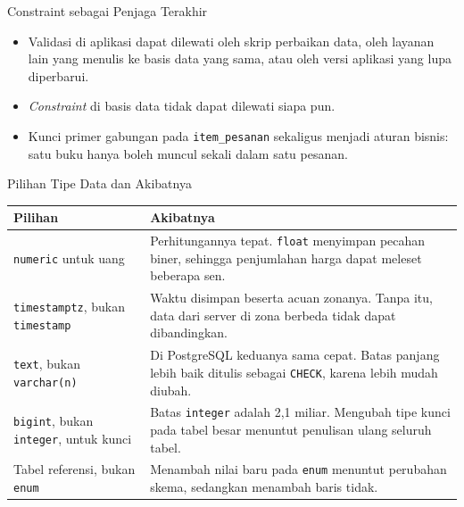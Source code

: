 \documentclass[aspectratio=169, table, 12pt]{beamer}
\begin{document}
\begin{frame}{{\Large Constraint sebagai Penjaga Terakhir}}
  \vspace{10pt}
  \begin{itemize}
    \item Validasi di aplikasi dapat dilewati oleh skrip perbaikan data, oleh
          layanan lain yang menulis ke basis data yang sama, atau oleh versi
          aplikasi yang lupa diperbarui.
    \item \textit{Constraint} di basis data tidak dapat dilewati siapa pun.
    \item Kunci primer gabungan pada \texttt{item\_pesanan} sekaligus menjadi
          aturan bisnis: satu buku hanya boleh muncul sekali dalam satu
          pesanan.
  \end{itemize}
\end{frame}

\begin{frame}{{\Large Pilihan Tipe Data dan Akibatnya}}
  \vspace{5pt}
  \centering
  {\scriptsize
  \begin{tabularx}{\textwidth}{lX}
    \hline
    \textbf{Pilihan} & \textbf{Akibatnya} \\
    \hline
    \texttt{numeric} untuk uang & Perhitungannya tepat. \texttt{float} menyimpan pecahan biner, sehingga penjumlahan harga dapat meleset beberapa sen. \\
    \hline
    \texttt{timestamptz}, bukan \texttt{timestamp} & Waktu disimpan beserta acuan zonanya. Tanpa itu, data dari server di zona berbeda tidak dapat dibandingkan. \\
    \hline
    \texttt{text}, bukan \texttt{varchar(n)} & Di PostgreSQL keduanya sama cepat. Batas panjang lebih baik ditulis sebagai \texttt{CHECK}, karena lebih mudah diubah. \\
    \hline
    \texttt{bigint}, bukan \texttt{integer}, untuk kunci & Batas \texttt{integer} adalah 2,1 miliar. Mengubah tipe kunci pada tabel besar menuntut penulisan ulang seluruh tabel. \\
    \hline
    Tabel referensi, bukan \texttt{enum} & Menambah nilai baru pada \texttt{enum} menuntut perubahan skema, sedangkan menambah baris tidak. \\
    \hline
  \end{tabularx}}
\end{frame}
\end{document}

